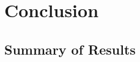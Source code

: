 
\chapter{Conclusion}\label{c:conclusion}


\section{Summary of Results}
\label{s:conclusions-summary}








